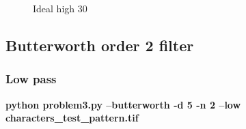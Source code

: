\begin{figure}[!htb]
\begin{minipage}{0.45\textwidth}
            \caption{\small{Ideal high 30}}\label{diagram:ideal_high_30}
            \end{minipage}
        \end{figure}


    \pagebreak
    \subsection{Butterworth order 2 filter}

        \subsubsection{Low pass}

        \small{\textbf{python problem3.py --butterworth -d 5 -n 2 --low characters\_test\_pattern.tif}}

